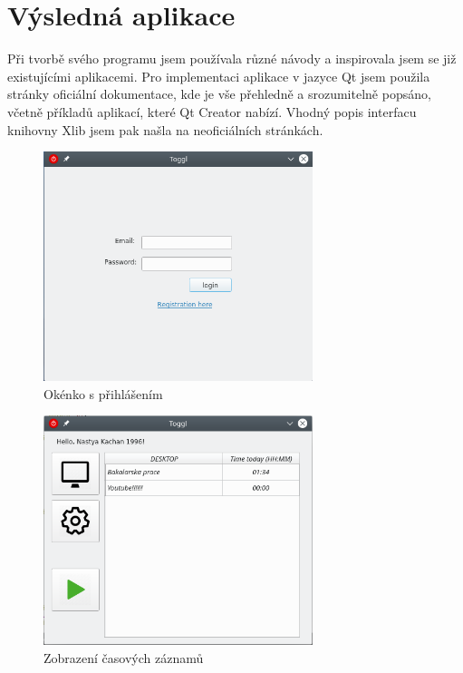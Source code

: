 \documentclass[thesis=B,czech]{FITthesis}[2012/06/26]
\begin{document}
\section{Výsledná aplikace}

Při tvorbě svého programu jsem používala různé návody a inspirovala jsem se již existujícími aplikacemi. Pro implementaci aplikace v jazyce Qt jsem použila stránky oficiální dokumentace, kde je vše přehledně a srozumitelně popsáno, včetně příkladů aplikací, které Qt Creator nabízí. Vhodný popis interfacu knihovny Xlib jsem pak našla na neoficiálních stránkách. 


\begin{figure}[h]\centering
	\includegraphics[width=0.7\textwidth]{toggl_login.png}
	\caption[Okénko s přihlášením]{Okénko s přihlášením}\label{fig:t_login}
\end{figure}


\begin{figure}[h]\centering
	\includegraphics[width=0.7\textwidth]{toggl_list.png}
	\caption[Zobrazení časových záznamů]{Zobrazení časových záznamů}\label{fig:t_list}
\end{figure}
\end{document}
